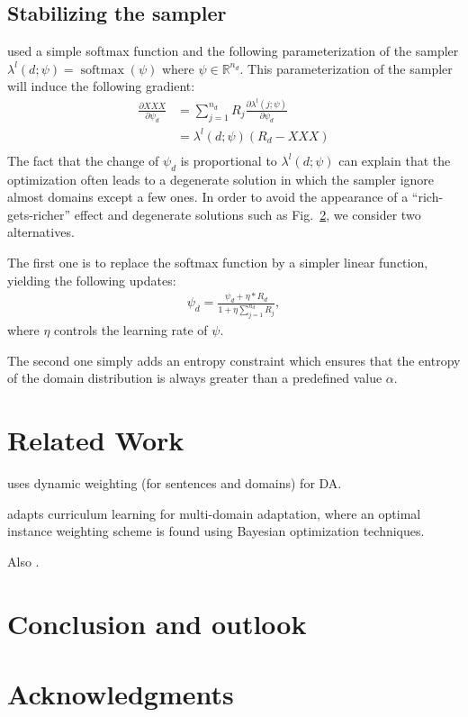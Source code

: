 \documentclass[11pt,a4paper]{article}
\newcommand{\fyTodo}[1]{\Todo[FY:]{\textcolor{orange}{#1}}}
\begin{document}
\subsection{Stabilizing the sampler \label{ssec:sampler}}

\cite{Wang20balancing} used a simple softmax function and the following parameterization of the sampler $\lambda^l(d;\psi) = \operatorname{softmax}(\psi)$ where $\psi \in \mathbb{R}^{n_d}$. This parameterization of the sampler will induce the following gradient:\fyTodo{Change name of obj. function}
\begin{align*}
\frac{\partial XXX}{\partial \psi_d} & = \displaystyle{\mathop{\sum}_{j=1}^{n_d}} R_j \frac{\partial \lambda^l(j; \psi)}{\partial \psi_d} \\
	& = \lambda^l(d; \psi) (R_d- XXX)\\
\end{align*} 
The fact that the change of $\psi_d$ is proportional to $\lambda^l(d; \psi)$ can explain that the optimization often leads to a degenerate solution in which the sampler ignore almost domains except a few ones. In order to avoid the appearance of a ``rich-gets-richer'' effect and degenerate solutions such as Fig.~\ref{}, we consider two alternatives.

The first one is to replace the softmax function by a simpler linear function, yielding the following updates:
\begin{align*}
\psi_d = \frac{\psi_d + \eta * R_d}{ 1 + \eta \displaystyle{\mathop{\sum}_{j=1}^{n_d}} R_j},
\end{align*}
where $\eta$ controls the learning rate of $\psi$.

The second one simply adds an entropy constraint which ensures that the entropy of the domain distribution is always greater than a predefined value $\alpha$.\fyTodo{Explain the math}



\section{Related Work \label{sec:related}}
\cite{Wang17instance} uses dynamic weighting (for sentences and domains) for DA.

\cite{Wang20learning-multi} adapts curriculum learning \cite{BengioXX} for multi-domain adaptation, where an optimal instance weighting scheme is found using Bayesian optimization techniques.

Also \cite{Saunders19adaptive}.

\section{Conclusion and outlook \label{sec:discussion}}
\section*{Acknowledgments}


\end{document}
